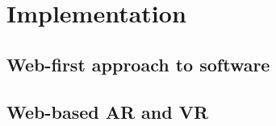 \chapter{Implementation}

\section{Web-first approach to software}
\label{chapter2-web-first-approach-to-software}






\section{Web-based AR and VR}
\label{chapter2-web-based-ar-and-vr}


